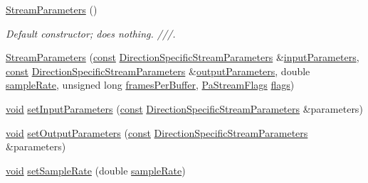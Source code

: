 \begin{DoxyCompactItemize}
\item 
\hyperlink{classportaudio_1_1_stream_parameters_a6191380c00b1172dcb8c3e2552df7789}{Stream\+Parameters} ()
\begin{DoxyCompactList}\small\item\em Default constructor; does nothing. ///. \end{DoxyCompactList}\item 
\hyperlink{classportaudio_1_1_stream_parameters_a3d53dd00a082b28164ddcf4aa948dcbc}{Stream\+Parameters} (\hyperlink{getopt1_8c_a2c212835823e3c54a8ab6d95c652660e}{const} \hyperlink{classportaudio_1_1_direction_specific_stream_parameters}{Direction\+Specific\+Stream\+Parameters} \&\hyperlink{classportaudio_1_1_stream_parameters_ae542d042811e1ed75b3d6b3ce5882129}{input\+Parameters}, \hyperlink{getopt1_8c_a2c212835823e3c54a8ab6d95c652660e}{const} \hyperlink{classportaudio_1_1_direction_specific_stream_parameters}{Direction\+Specific\+Stream\+Parameters} \&\hyperlink{classportaudio_1_1_stream_parameters_a9367d27c08eb1c5af6ded564f76be116}{output\+Parameters}, double \hyperlink{classportaudio_1_1_stream_parameters_ace4fd8d5746ff6d6f664eefd50cb01c0}{sample\+Rate}, unsigned long \hyperlink{classportaudio_1_1_stream_parameters_a537f89fa6f1fcc750bad7cb961bb44ab}{frames\+Per\+Buffer}, \hyperlink{portaudio_8h_a37c7ac3ace7d2dd1430f40ecdee4ebb6}{Pa\+Stream\+Flags} \hyperlink{classportaudio_1_1_stream_parameters_a24de4bfc9080fc2f664a0e0e9e895197}{flags})
\item 
\hyperlink{sound_8c_ae35f5844602719cf66324f4de2a658b3}{void} \hyperlink{classportaudio_1_1_stream_parameters_a50f0e69ad3864633f3dbfda4f419aeae}{set\+Input\+Parameters} (\hyperlink{getopt1_8c_a2c212835823e3c54a8ab6d95c652660e}{const} \hyperlink{classportaudio_1_1_direction_specific_stream_parameters}{Direction\+Specific\+Stream\+Parameters} \&parameters)
\item 
\hyperlink{sound_8c_ae35f5844602719cf66324f4de2a658b3}{void} \hyperlink{classportaudio_1_1_stream_parameters_afa10a9527898ad809d6dc85c58a9bdb0}{set\+Output\+Parameters} (\hyperlink{getopt1_8c_a2c212835823e3c54a8ab6d95c652660e}{const} \hyperlink{classportaudio_1_1_direction_specific_stream_parameters}{Direction\+Specific\+Stream\+Parameters} \&parameters)
\item 
\hyperlink{sound_8c_ae35f5844602719cf66324f4de2a658b3}{void} \hyperlink{classportaudio_1_1_stream_parameters_a0f7fa5712fd169f941c2ae189a450c15}{set\+Sample\+Rate} (double \hyperlink{classportaudio_1_1_stream_parameters_ace4fd8d5746ff6d6f664eefd50cb01c0}{sample\+Rate})

\end{DoxyCompactItemize}
